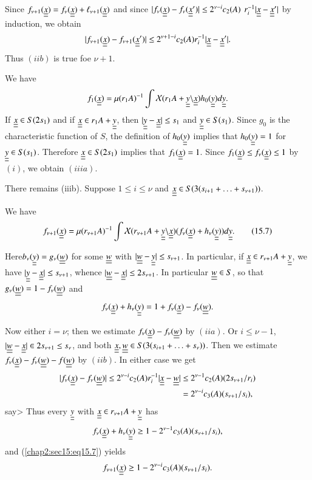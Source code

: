 Since $f_{\nu+1} (\uub{x}) = f_{\nu} (\uub{x}) + \ell_{\nu+1} (\uub{x})$ and since $|f_{\nu}(\uub{x}) - f_{\nu}(\uub{x}')| \leq 2^{\nu-i} c_{2} (A)$ $r_{i}^{-1} |\uub{x} - \uub{x}'|$ by induction, we obtain
$$
|f_{\nu+1} (\uub{x}) - f_{\nu+1} (\uub{x}')| \leq 2^{\nu+1-i} c_{2} (A) r_{i}^{-1} |\uub{x} - \uub{x}'|.
$$
Thus $(iib)$ is true foe $\nu + 1$.

We have
$$
f_{1} (\uub{x}) = \mu(r_{1} A)^{-1} \int \mathcal{X}(r_{1} A + \uub{y} \backslash \uub{x}) h_{0} (\uub{y}) d\uub{y}.
$$
If $\uub{x} \in S(2s_{1})$ and if $\uub{x} \in r_{1} A + \uub{y}$, then $|\uub{y} - \uub{x}| \leq s_{1}$ and $\uub{y} \in S(s_{1})$. Since $g_{0}$ is the characteristic function of $S$, the definition of $h_{0} (\uub{y})$ implies that $h_{0}(\uub{y}) = 1$ for $\uub{y} \in S(s_{1})$. Therefore $\uub{x} \in S(2s_{1})$ implies that $f_{1}(\uub{x}) = 1$. Since $f_{1} (\uub{x}) \leq f_{\nu} (\uub{x}) \leq 1$ by $(i)$, we obtain $(iiia)$.

There remains (iiib). Suppose $1 \leq i \leq \nu$ and $\uub{x} \in S(3(s_{i+1} + \ldots + s_{\nu+1}))$.

We have
\begin{equation*}
f_{\nu+1} (\uub{x}) = \mu (r_{\nu+1} A)^{-1} \int \mathcal{X} (r_{\nu+1} A + \uub{y} \backslash \uub{x}) (f_{\nu} (\uub{x}) + h_{\nu} (\uub{y})) d\uub{y}.\tag{15.7}\label{chap2:sec15:eq15.7}
\end{equation*}

Here\pageoriginale $b_{\nu} (\uub{y}) = g_{\nu} (\uub{w})$ for some $\uub{w}$ with $|\uub{w} - \uub{y}| \leq s_{\nu+1}$. In particular, if $\uub{x} \in r_{\nu+1} A + \uub{y}$, we have $|\uub{y} - \uub{x}| \leq s_{\nu+1}$, whence $|\uub{w} - \uub{x}| \leq 2s_{\nu+1}$. In particular $\uub{w} \in S$, so that $g_{\nu} (\uub{w}) = 1 - f_{\nu} (\uub{w})$ and
$$
f_{\nu} (\uub{x}) + h_{\nu} (\uub{y}) = 1 + f_{\nu} (\uub{x}) - f_{\nu} (\uub{w}).
$$

Now either $i = \nu$; then we estimate $f_{\nu} (\uub{x}) - f_{\nu}(\uub{w})$ by $(iia)$. Or $i \leq \nu - 1$, $|\uub{w} - \uub{x}| \in 2s_{\nu+1} \leq s_{\nu}$, and both $\uub{x}, \uub{w} \in S(3(s_{i+1} + \ldots + s_{\nu}))$. Then we estimate $f_{\nu} (\uub{x}) - f_{\nu} (\uub{w}) - f (\uub{w})$ by $(iib)$. In either case we get
\begin{align*}
|f_{\nu} (\uub{x}) - f_{\nu} (\uub{w})|  \leq 2^{\nu - i} c_{2} (A) r_{i}^{-1} |\uub{x} - \uub{w}| & \leq 2^{\nu - 1} c_{2} (A) (2s_{\nu + 1} / r_{i})\\
& = 2^{\nu - i} c_{3} (A) (s_{\nu+1}/s_{i}),
\end{align*}
say> Thus every $\uub{y}$ with $\uub{x} \in r_{\nu+1} A + \uub{y}$ has
$$
f_{\nu} (\uub{x}) + h_{\nu} (\uub{y}) \geq 1 - 2^{\nu - 1} c_{3} (A) (s_{\nu+1}/ s_{i}),
$$
and (\ref{chap2:sec15:eq15.7}) yields
$$
f_{\nu+1} (\uub{x}) \geq 1 - 2^{\nu-i} c_{3} (A) (s_{\nu+1} / s_{i}).
$$

